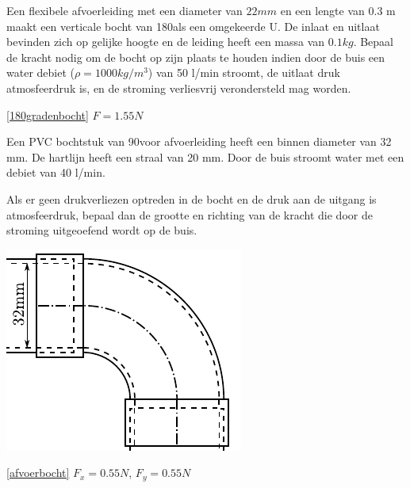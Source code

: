 \begin{toepassing}
	\label{180gradenbocht}
Een flexibele afvoerleiding met een diameter van $22 \unit{mm}$ en een lengte van 0.3 m maakt een verticale bocht van 180\deg als een omgekeerde U. De inlaat en uitlaat bevinden zich op gelijke hoogte en de leiding heeft een massa van $0.1 \unit{kg}$. Bepaal de kracht nodig om de bocht op zijn plaats te houden indien door de buis een water debiet ($\rho=1000 \unit{kg/m^3}$) van 50 l/min stroomt, de uitlaat druk atmosfeerdruk is, en de stroming verliesvrij verondersteld mag worden.
\end{toepassing}
\begin{antwoord}{\ref{180gradenbocht}}
	$F = 1.55 \unit{N}$
\end{antwoord}
\begin{toepassing}
	\label{afvoerbocht}
Een PVC bochtstuk van 90\deg voor afvoerleiding heeft een binnen diameter van 32 mm. De hartlijn heeft een straal van 20 mm. Door de buis stroomt water met een debiet van 40 l/min.
		
Als er geen drukverliezen optreden in de bocht en de druk aan de uitgang is atmosfeerdruk, bepaal dan de grootte en richting van de kracht die door de stroming uitgeoefend wordt op de buis.

	\centering
	\includegraphics{fig/behoudsvergelijkingen/afvoerbocht}
\end{toepassing}
\begin{antwoord}{\ref{afvoerbocht}}
	$F_x = 0.55 \unit{N}$, $F_y = 0.55 \unit{N}$
\end{antwoord}
